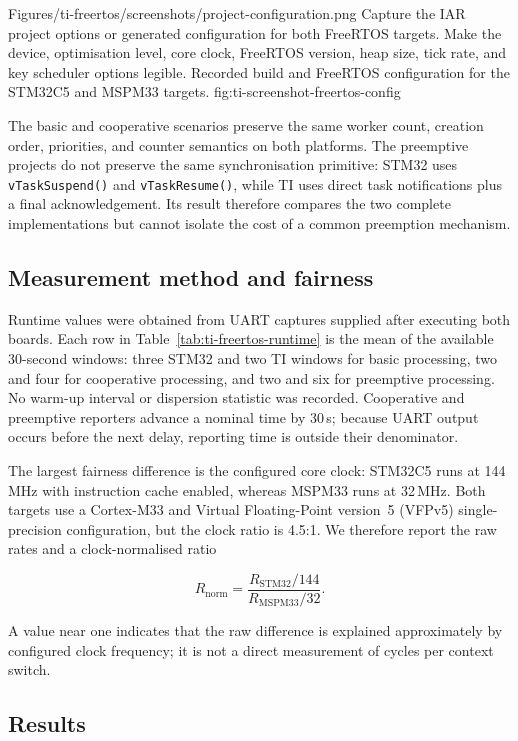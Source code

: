 \reportscreenshot
      {Figures/ti-freertos/screenshots/project-configuration.png}
      {Capture the IAR project options or generated configuration for both FreeRTOS targets. Make the device, optimisation level, core clock, FreeRTOS version, heap size, tick rate, and key scheduler options legible.}
      {Recorded build and FreeRTOS configuration for the STM32C5 and MSPM33 targets.}
      {fig:ti-screenshot-freertos-config}

The basic and cooperative scenarios preserve the same worker count, creation order, priorities,
and counter semantics on both platforms. The preemptive projects do not preserve the same
synchronisation primitive: STM32 uses \texttt{vTaskSuspend()} and \texttt{vTaskResume()}, while
TI uses direct task notifications plus a final acknowledgement. Its result therefore compares
the two complete implementations but cannot isolate the cost of a common preemption mechanism.

\subsection{Measurement method and fairness}
\label{subsec:ti-freertos-method}

Runtime values were obtained from UART captures supplied after executing both boards. Each row
in Table~\ref{tab:ti-freertos-runtime} is the mean of the available 30-second windows: three
STM32 and two TI windows for basic processing, two and four for cooperative processing, and two
and six for preemptive processing. No warm-up interval or dispersion statistic was recorded.
Cooperative and preemptive reporters advance a nominal time by 30\,s; because UART output occurs
before the next delay, reporting time is outside their denominator.

The largest fairness difference is the configured core clock: STM32C5 runs at 144\,MHz with
instruction cache enabled, whereas MSPM33 runs at 32\,MHz. Both targets use a Cortex-M33 and
Virtual Floating-Point version~5 (VFPv5) single-precision configuration, but the clock ratio is
4.5:1. We therefore report the raw rates and a clock-normalised ratio

\[
R_{\mathrm{norm}} = \frac{R_{\mathrm{STM32}}/144}{R_{\mathrm{MSPM33}}/32}.
\]

A value near one indicates that the raw difference is explained approximately by configured
clock frequency; it is not a direct measurement of cycles per context switch.

\subsection{Results}
\label{subsec:ti-freertos-results}


